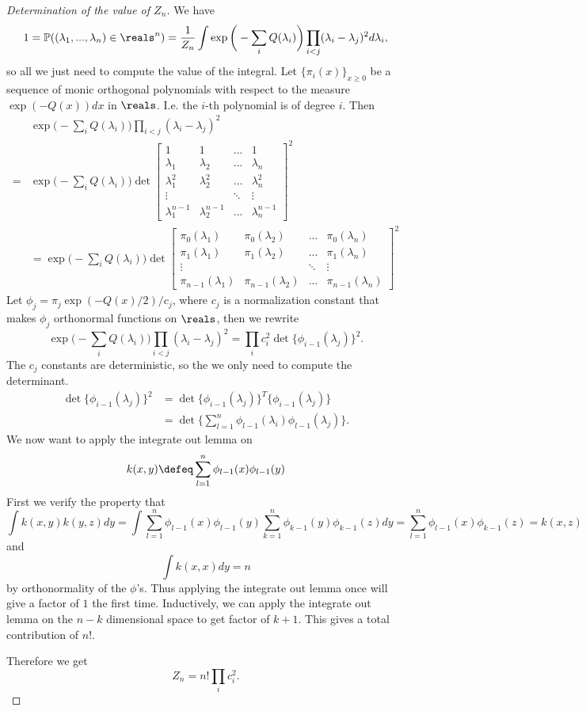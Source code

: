 \begin{proof}[Determination of the value of $Z_n$]
We have \[
1 = \mathbb{P}((\lambda_1,...,\lambda_n) \in \reals^n) = \frac{1}{Z_n}\int \exp\bigg(- \sum_{i} Q(\lambda_i)\bigg)\prod_{i<j}(\lambda_i -\lambda_j)^2 d\lambda_i,
\]
so all we just need to compute the value of the integral.
Let $\{\pi_i(x)\}_{x\geq 0}$ be a sequence of monic orthogonal polynomials with respect to the measure $\exp ( -Q(x)) dx$ in $\reals$. I.e. the $i$-th polynomial is of degree $i$. Then \begin{align*}
    &\exp\bigg(- \sum_{i} Q(\lambda_i)\bigg)\prod_{i<j}(\lambda_i -\lambda_j)^2 \\
    =&\exp\bigg(- \sum_{i} Q(\lambda_i)\bigg)\det
    \begin{bmatrix}
        1 & 1 & ... & 1 \\
        \lambda_1 & \lambda_2 & ... & \lambda_n \\ 
        \lambda_1^2& \lambda_2^2 & ... & \lambda_n^2\\
        \vdots & &\ddots&\vdots\\
        \lambda_1^{n-1}&\lambda_2^{n-1}&...&\lambda_n^{n-1}
    \end{bmatrix}^2\\
    &=\exp\bigg(- \sum_{i} Q(\lambda_i)\bigg)
    \det \begin{bmatrix}
        \pi_0(\lambda_1) & \pi_0(\lambda_2) & ... & \pi_0(\lambda_n) \\
       \pi_1(\lambda_1) & \pi_1(\lambda_2)& ... & \pi_1(\lambda_n) \\
        \vdots & &\ddots&\vdots\\
        \pi_{n-1}(\lambda_1)&\pi_{n-1}(\lambda_2)&...&\pi_{n-1}(\lambda_n)
    \end{bmatrix}^2
\end{align*}
Let $\phi_j = \pi_j \exp (-Q(x)/2) /c_j$, where $c_j$ is a normalization constant that makes $\phi_j$ orthonormal functions on $\reals$, then we rewrite\[
\exp\bigg(- \sum_{i} Q(\lambda_i)\bigg)\prod_{i<j}(\lambda_i -\lambda_j)^2 = \prod_{i}c_i^2 \det \{\phi_{i-1}(\lambda_j)\}^2.
\]
The $c_j$ constants are deterministic, so the we only need to compute the determinant.
\begin{align*}
    \det \{\phi_{i-1}(\lambda_j)\}^2 &= \det \{\phi_{i-1}(\lambda_j)\}^T \{\phi_{i-1}(\lambda_j)\}\\
    &= \det \{\sum_{l=1}^{n}\phi_{l-1}(\lambda_i)\phi_{l-1}(\lambda_j)\}.
\end{align*}
We now want to apply the integrate out lemma on \[
k(x,y) \defeq \sum_{l=1}^{n}\phi_{l-1}(x)\phi_{l-1}(y)
\]
First we verify the property that \[
\int k(x,y)k(y,z) dy = \int \sum_{l=1}^{n}\phi_{l-1}(x)\phi_{l-1}(y) \sum_{k=1}^{n}\phi_{k-1}(y)\phi_{k-1}(z) dy = \sum_{l=1}^{n}\phi_{l-1}(x)\phi_{k-1}(z) = k(x,z)
\] 
and \[
\int k(x,x) dy = n
\]
by orthonormality of the $\phi$'s.
Thus applying the integrate out lemma once will give a factor of $1$ the first time. Inductively, we can apply the integrate out lemma on the $n-k$ dimensional space to get factor of $k+1$. This gives a total contribution of $n!$.

Therefore we get \[
Z_n=n! \prod_i c_i^2.
\]
\end{proof}


